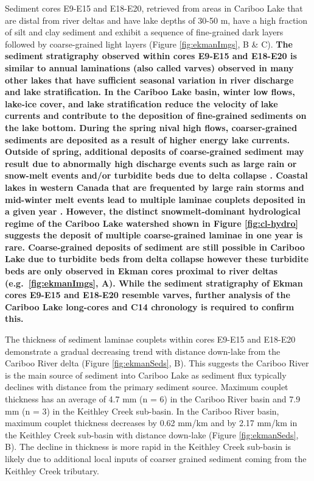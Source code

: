 \documentclass[Royal,times,doublespace,sageh]{sagej}
\begin{document}
Sediment cores E9-E15 and E18-E20, retrieved from areas in Cariboo Lake
that are distal from river deltas and have lake depths of 30-50 m, have
a high fraction of silt and clay sediment and exhibit a sequence of
fine-grained dark layers followed by coarse-grained light layers (Figure
\ref{fig:ekmanImgs}, B \& C). \textbf{The sediment stratigraphy observed
within cores E9-E15 and E18-E20 is similar to annual laminations (also
called varves) observed in many other lakes
\citep{Cockburn2008, Zolitschka2015a, Heideman2015, Hodder2006b, Desloges1999}
that have sufficient seasonal variation in river discharge and lake
stratification. In the Cariboo Lake basin, winter low flows, lake-ice
cover, and lake stratification reduce the velocity of lake currents and
contribute to the deposition of fine-grained sediments on the lake
bottom. During the spring nival high flows, coarser-grained sediments
are deposited as a result of higher energy lake currents. Outside of
spring, additional deposits of coarse-grained sediment may result due to
abnormally high discharge events such as large rain or snow-melt events
and/or turbidite beds due to delta collapse \citep{sabatier2022}.
Coastal lakes in western Canada that are frequented by large rain storms
and mid-winter melt events lead to multiple laminae couplets deposited
in a given year \citep{Menounos2008c}. However, the distinct
snowmelt-dominant hydrological regime of the Cariboo Lake watershed
shown in Figure \ref{fig:cl-hydro} suggests the deposit of multiple
coarse-grained laminae in one year is rare. Coarse-grained deposits of
sediment are still possible in Cariboo Lake due to turbidite beds from
delta collapse however these turbidite beds are only observed in Ekman
cores proximal to river deltas (e.g.~\ref{fig:ekmanImgs}, A). While the
sediment stratigraphy of Ekman cores E9-E15 and E18-E20 resemble varves,
further analysis of the Cariboo Lake long-cores and C14 chronology is
required to confirm this.}

The thickness of sediment laminae couplets within cores E9-E15 and
E18-E20 demonstrate a gradual decreasing trend with distance down-lake
from the Cariboo River delta (Figure \ref{fig:ekmanSeds}, B). This
suggests the Cariboo River is the main source of sediment into Cariboo
Lake as sediment flux typically declines with distance from the primary
sediment source. Maximum couplet thickness has an average of 4.7 mm (n =
6) in the Cariboo River basin and 7.9 mm (n = 3) in the Keithley Creek
sub-basin. In the Cariboo River basin, maximum couplet thickness
decreases by 0.62 mm/km and by 2.17 mm/km in the Keithley Creek
sub-basin with distance down-lake (Figure \ref{fig:ekmanSeds}, B). The
decline in thickness is more rapid in the Keithley Creek sub-basin is
likely due to additional local inputs of coarser grained sediment coming
from the Keithley Creek tributary.
\end{document}
